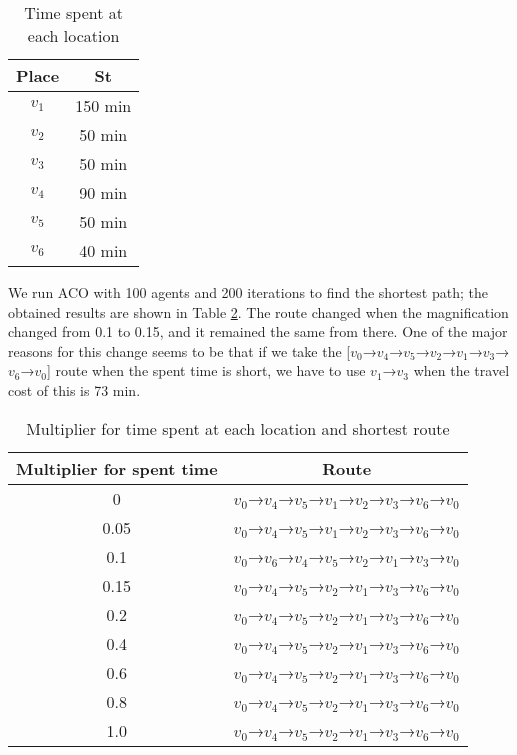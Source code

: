 \documentclass[conference]{IEEEtran}
\begin{document}
\begin{table}[h]
  \begin{center}
     \caption{Time spent at each location}
     \begin{tabular}{|c||c|} \hline
      Place & St \\ \hline \hline
      $v_1$ &  150 min \\  \hline
      $v_2$ & 50 min \\  \hline
      $v_3$ & 50 min \\  \hline
      $v_4$ & 90 min \\  \hline
      $v_5$ & 50 min \\  \hline
      $v_6$ & 40 min \\  \hline
    \end{tabular}
    \label{fig:staytime}
  \end{center}
\end{table}

\par We run ACO with 100 agents and 200 iterations to find the shortest path; the obtained results are shown in Table \ref{fig:routechange}.
The route changed when the magnification changed from 0.1 to 0.15, and it remained the same from there.
One of the major reasons for this change seems to be that if we take the [$v_0$→$v_4$→$v_5$→$v_2$→$v_1$→$v_3$→$v_6$→$v_0$] route when the spent time is short, we have to use $v_1$→$v_3$ when the travel cost of this is 73 min.

\begin{table}[h]
  \begin{center}
     \caption{Multiplier for time spent at each location and shortest route}
     \begin{tabular}{|c||c|} \hline
      Multiplier for spent time& Route \\ \hline \hline
      0 &  $v_0$→$v_4$→$v_5$→$v_1$→$v_2$→$v_3$→$v_6$→$v_0$ \\  \hline
      0.05 &  $v_0$→$v_4$→$v_5$→$v_1$→$v_2$→$v_3$→$v_6$→$v_0$ \\  \hline
      0.1 &  $v_0$→$v_6$→$v_4$→$v_5$→$v_2$→$v_1$→$v_3$→$v_0$ \\  \hline
      0.15 &  $v_0$→$v_4$→$v_5$→$v_2$→$v_1$→$v_3$→$v_6$→$v_0$ \\  \hline
      0.2 &  $v_0$→$v_4$→$v_5$→$v_2$→$v_1$→$v_3$→$v_6$→$v_0$ \\  \hline
      0.4 &  $v_0$→$v_4$→$v_5$→$v_2$→$v_1$→$v_3$→$v_6$→$v_0$ \\  \hline
      0.6 &  $v_0$→$v_4$→$v_5$→$v_2$→$v_1$→$v_3$→$v_6$→$v_0$ \\  \hline
      0.8 &  $v_0$→$v_4$→$v_5$→$v_2$→$v_1$→$v_3$→$v_6$→$v_0$ \\  \hline
      1.0 &  $v_0$→$v_4$→$v_5$→$v_2$→$v_1$→$v_3$→$v_6$→$v_0$ \\  \hline
    \end{tabular}
    \label{fig:routechange}
  \end{center}
\end{table}
\end{document}
